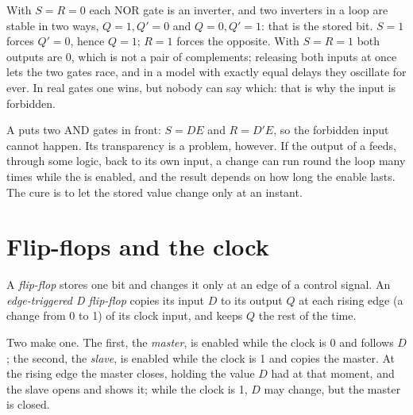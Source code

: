 With $S = R = 0$ each NOR gate is an inverter, and two inverters in a loop are stable in two ways, $Q = 1, Q' = 0$ and
$Q = 0, Q' = 1$: that is the stored bit. $S = 1$ forces $Q' = 0$, hence $Q = 1$; $R = 1$ forces the opposite. With $S = R
= 1$ both outputs are 0, which is not a pair of complements; releasing both inputs at once lets the two gates race,
and in a model with exactly equal delays they oscillate for ever. In real gates one wins, but nobody can say which: that is
why the input is forbidden.

A  puts two AND gates in front: $S = DE$ and $R = D'E$, so the forbidden input cannot happen. Its transparency is a
problem, however. If the output of a  feeds, through some logic, back to its own input, a change can run round the
loop many times while the  is enabled, and the result depends on how long the enable lasts. The cure is to let the
stored value change only at an instant.

\section{Flip-flops and the clock}\label{sec:b1:sequential-circuits:clock}

\begin{definition}\label{def:b1:sequential-circuits:flip-flop}
A \emph{flip-flop} stores one bit and changes it only at an edge of a control signal. An
\emph{edge-triggered D flip-flop} copies its input $D$ to its output $Q$ at each
rising edge (a change from 0 to 1) of its clock input, and keeps $Q$ the rest of the time.
\end{definition}

Two  make one. The first, the \emph{master}, is enabled while the clock is 0 and follows $D$; the second, the
\emph{slave}, is enabled while the clock is 1 and copies the master. At the rising edge the master closes, holding the
value $D$ had at that moment, and the slave opens and shows it; while the clock is 1, $D$ may change, but the master is
closed.

\label{lst:b1:sequential-circuits:dff}

